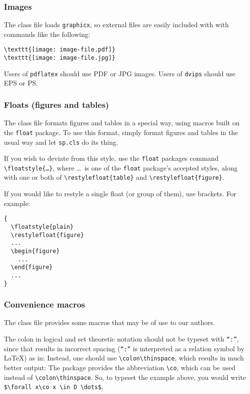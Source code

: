 \documentclass[lucida,final]{sp}
\newcommand{\spfile}[1]{\texttt{#1}}
\newcommand{\spcode}[1]{\texttt{#1}}
\newcommand{\argcmd}[2]{\texttt{\textbackslash#1\{#2\}}}
\begin{document}
\subsubsection{Images}

The class file loads \spfile{graphicx}, so external files are easily
included with with commands like the following:
%
\begin{Verbatim}
\texttt{[image: image-file.pdf]}
\texttt{[image: image-file.jpg]}
\end{Verbatim}
%
Users of \spfile{pdflatex} should use PDF or JPG images.  Users of
\spfile{dvips} should use EPS or PS.


\subsubsection{Floats (figures and tables)}

The class file formats figures and tables in a special way, using
macros built on the \spfile{float} package. To use this format, simply
format figures and tables in the usual way and let \spfile{sp.cls} do
its thing.

If you wish to deviate from this style, use the \spfile{float}
packages command \argcmd{floatstyle}{\ldots}, where \ldots\ is one of
the \spfile{float} package's accepted styles, along with one or both
of \argcmd{restylefloat}{table} and \argcmd{restylefloat}{figure}.

If you would like to restyle a single float (or group of them), use
brackets.  For example:

\begin{Verbatim}
{
  \floatstyle{plain}
  \restylefloat{figure}
  ...
  \begin{figure}
    ...
  \end{figure}
  ...
}
\end{Verbatim}


\subsubsection{Convenience macros}

The class file provides some macros that may be of use to our authors.

The colon in logical and set theoretic notation should not be typeset
with \spcode{``:''}, since that results in incorrect spacing
(\spcode{``:''} is interpreted as a relation symbol by \LaTeX) as in:
%
%
Instead, one should use \verb?\colon\thinspace?, which results in much
better output:
%
%
The package provides the abbreviation \verb?\co?, which can be used
instead of \verb?\colon\thinspace?. So, to typeset the example above,
you would write \verb?$\forall x\co x \in D \dots$?.
\end{document}
